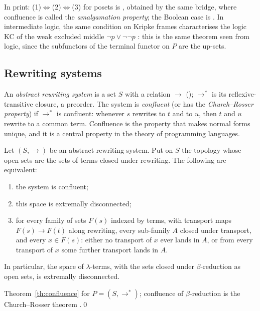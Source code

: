 \status{} In print: (1)$\Leftrightarrow$(2)$\Leftrightarrow$(3) for posets is \cite[Prop.~7.10(ii)]{caramello-stone}, obtained by the same bridge, where confluence is called the \emph{amalgamation property}; the Boolean case is \cite[Prop.~7.8(ii)]{caramello-stone}. In intermediate logic, the same condition on Kripke frames characterises the logic KC of the weak excluded middle $\neg p\vee\neg\neg p$ \cite{chagrov}: this is the same theorem seen from logic, since the subfunctors of the terminal functor on $P$ are the up-sets.

\subsection{Rewriting systems}

An \emph{abstract rewriting system} is a set $S$ with a relation $\to$ (); $\to^*$ is its reflexive-transitive closure, a preorder. The system is \emph{confluent} (or has the \emph{Church--Rosser property}) if $\to^*$ is confluent: whenever $s$ rewrites to $t$ and to $u$, then $t$ and $u$ rewrite to a common term. Confluence is the property that makes normal forms unique, and it is a central property in the theory of programming languages.

\begin{corollary}\label{co:rewriting}
Let $(S,\to)$ be an abstract rewriting system. Put on $S$ the topology whose open sets are the sets of terms closed under rewriting. The following are equivalent:
\begin{enumerate}
\item the system is confluent;
\item this space is extremally disconnected;
\item for every family of sets $F(s)$ indexed by terms, with transport maps $F(s)\to F(t)$ along rewriting, every sub-family $A$ closed under transport, and every $x\in F(s)$: either no transport of $x$ ever lands in $A$, or from every transport of $x$ some further transport lands in $A$.
\end{enumerate}
In particular, the space of $\lambda$-terms, with the sets closed under $\beta$-reduction as open sets, is extremally disconnected.
\end{corollary}

\direct{} Theorem~\ref{th:confluence} for $P = (S,\to^*)$; confluence of $\beta$-reduction is the Church--Rosser theorem \cite{barendregt}.\qed


